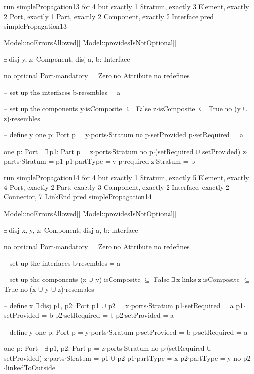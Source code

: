 run simplePropagation13 for 4 but exactly 1 Stratum, exactly 3 Element, exactly 2 Port, exactly 1 Part, exactly 2 Component, exactly 2 Interface
pred simplePropagation13
{
  Model::noErrorsAllowed[]
  Model::providesIsNotOptional[]

  $\exists\,$disj y, z: Component,
       disj a, b: Interface
  {
    no optional
    Port$\cdot$mandatory = Zero
    no Attribute
    no redefines
  
    -- set up the interfaces
    b$\cdot$resembles = a
  
    -- set up the components
    y$\cdot$isComposite $\subseteq$ False
    z$\cdot$isComposite $\subseteq$ True
    no (y $\cup$ z)$\cdot$resembles
    
    -- define y
    one p: Port
    {
      p = y$\cdot$ports$\cdot$Stratum
      no p$\cdot$setProvided
      p$\cdot$setRequired = a
    }
    
    one p: Port | $\exists\,$p1: Part
    {
      p = z$\cdot$ports$\cdot$Stratum
      no p$\cdot$(setRequired $\cup$ setProvided)
      z$\cdot$parts$\cdot$Stratum = p1
      p1$\cdot$partType = y
      p$\cdot$required$\cdot$z$\cdot$Stratum = b
    }
  }
}

run simplePropagation14 for 4 but exactly 1 Stratum, exactly 5 Element, exactly 4 Port, exactly 2 Part, exactly 3 Component, exactly 2 Interface, exactly 2 Connector, 7 LinkEnd
pred simplePropagation14
{
  Model::noErrorsAllowed[]
  Model::providesIsNotOptional[]

  $\exists\,$disj x, y, z: Component,
       disj a, b: Interface
  {
    no optional
    Port$\cdot$mandatory = Zero
    no Attribute
    no redefines
  
    -- set up the interfaces
    b$\cdot$resembles = a
  
    -- set up the components
    (x $\cup$ y)$\cdot$isComposite $\subseteq$ False
    $\exists\,$x$\cdot$links
    z$\cdot$isComposite $\subseteq$ True
    no (x $\cup$ y $\cup$ z)$\cdot$resembles
    
    -- define x
    $\exists\,$disj p1, p2: Port
    {
      p1 $\cup$ p2 = x$\cdot$ports$\cdot$Stratum
      p1$\cdot$setRequired = a
      p1$\cdot$setProvided = b
      p2$\cdot$setRequired = b
      p2$\cdot$setProvided = a
    }
    
    -- define y
    one p: Port
    {
      p = y$\cdot$ports$\cdot$Stratum
      p$\cdot$setProvided = b
      p$\cdot$setRequired = a
    }
    
    one p: Port | $\exists\,$p1, p2: Part
    {
      p = z$\cdot$ports$\cdot$Stratum
      no p$\cdot$(setRequired $\cup$ setProvided)
      z$\cdot$parts$\cdot$Stratum = p1 $\cup$ p2
      p1$\cdot$partType = x
      p2$\cdot$partType = y
      no p2$\cdot$linkedToOutside
    }
  }
}

